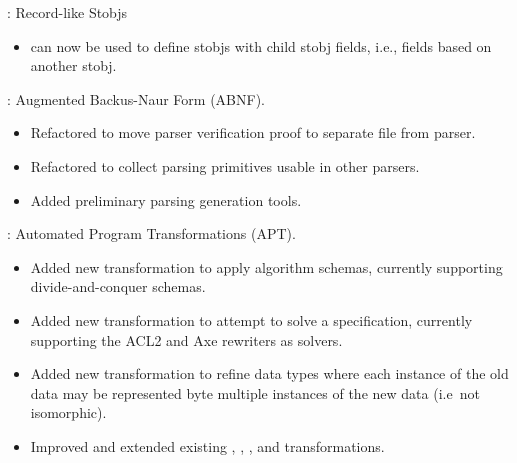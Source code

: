 
\begin{frame}

\implibtitle

:
Record-like Stobjs
\begin{itemize}
\item {} can now be used to define stobjs with child
      stobj fields, i.e., fields based on another stobj.
\end{itemize}

\end{frame}


\begin{frame}

\implibtitle

:
Augmented Backus-Naur Form (ABNF).
\begin{itemize}
\item Refactored to move parser verification proof to separate file from parser.
\item Refactored to collect parsing primitives usable in other parsers.
\item Added preliminary parsing generation tools.
\end{itemize}

\end{frame}


\begin{frame}

\implibtitle

:
Automated Program Transformations (APT).
\begin{itemize}
\item Added new  transformation to apply algorithm schemas,
      currently supporting divide-and-conquer schemas.
\item Added new  transformation to attempt to solve a specification,
      currently supporting the ACL2 and Axe rewriters as solvers.
\item Added new  transformation to refine data types
      where each instance of the old data may be represented byte
      multiple instances of the new data (i.e\ not isomorphic).
\item Improved and extended existing
      , , , and 
      transformations.
\end{itemize}

\end{frame}

